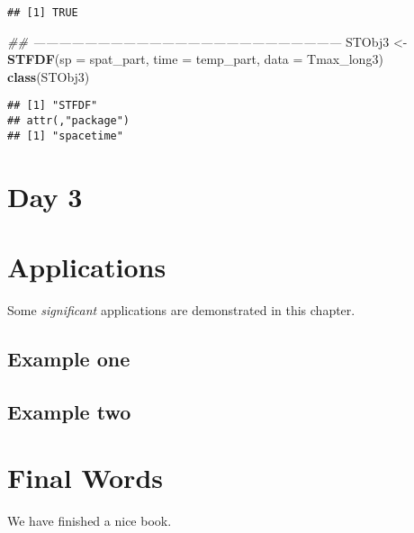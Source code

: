 \documentclass[]{book}
\newenvironment{Shaded}{\begin{snugshade}}{\end{snugshade}}
\newcommand{\CommentTok}[1]{\textcolor[rgb]{0.56,0.35,0.01}{\textit{#1}}}
\newcommand{\DataTypeTok}[1]{\textcolor[rgb]{0.13,0.29,0.53}{#1}}
\newcommand{\DecValTok}[1]{\textcolor[rgb]{0.00,0.00,0.81}{#1}}
\newcommand{\KeywordTok}[1]{\textcolor[rgb]{0.13,0.29,0.53}{\textbf{#1}}}
\newcommand{\NormalTok}[1]{#1}
\newcommand{\OperatorTok}[1]{\textcolor[rgb]{0.81,0.36,0.00}{\textbf{#1}}}
\newcommand{\OtherTok}[1]{\textcolor[rgb]{0.56,0.35,0.01}{#1}}
\newcommand{\StringTok}[1]{\textcolor[rgb]{0.31,0.60,0.02}{#1}}
\begin{document}
\begin{verbatim}
## [1] TRUE
\end{verbatim}

\begin{Shaded}
\begin{Highlighting}[]
\CommentTok{## ------------------------------------------------------------------------}
\NormalTok{STObj3 <-}\StringTok{ }\KeywordTok{STFDF}\NormalTok{(}\DataTypeTok{sp =}\NormalTok{ spat_part,}
                \DataTypeTok{time =}\NormalTok{ temp_part,}
                \DataTypeTok{data =}\NormalTok{ Tmax_long3)}
\KeywordTok{class}\NormalTok{(STObj3)}
\end{Highlighting}
\end{Shaded}

\begin{verbatim}
## [1] "STFDF"
## attr(,"package")
## [1] "spacetime"
\end{verbatim}

\begin{Shaded}
\end{Shaded}

\hypertarget{day-3}{%
\chapter{Day 3}\label{day-3}}

\hypertarget{applications}{%
\chapter{Applications}\label{applications}}

Some \emph{significant} applications are demonstrated in this chapter.

\hypertarget{example-one}{%
\section{Example one}\label{example-one}}

\hypertarget{example-two}{%
\section{Example two}\label{example-two}}

\hypertarget{final-words}{%
\chapter{Final Words}\label{final-words}}

We have finished a nice book.


\end{document}
